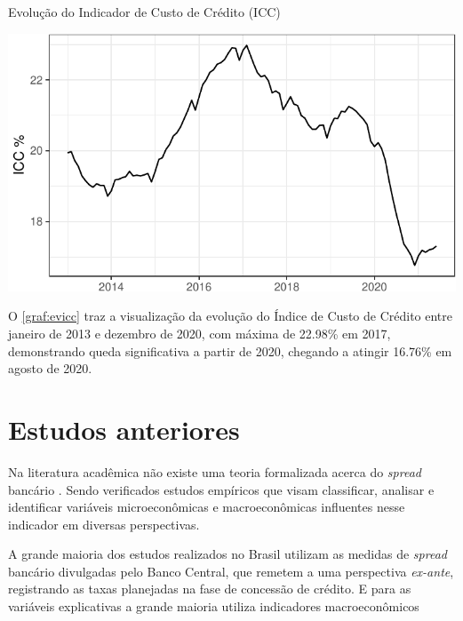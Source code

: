 \documentclass[
  12pt,
  12pt,
  openright,
  oneside,
  a4paper,
  chapter=TITLE,
  section=TITLE,
  subsection=TITLE,
  subsubsection=TITLE,
  english,
  portugues,
  sumario=tradicional]{abntex2}
\begin{document}
\begin{grafico}[!htbp]
\vspace{20pt}
\caption{Evolução do Indicador de Custo de Crédito (ICC)}
\vspace{-4mm}

\begin{center}\includegraphics{12-exportedfigures/ICC-1} \end{center}
\vspace{-3mm}
\label{graf:evicc}
\vspace{-2mm}
\end{grafico}

O \autoref{graf:evicc} traz a visualização da evolução do Índice de Custo de Crédito entre janeiro de 2013 e dezembro de 2020, com máxima de 22.98\% em 2017, demonstrando queda significativa a partir de 2020, chegando a atingir 16.76\% em agosto de 2020.

\section{Estudos anteriores}

Na literatura acadêmica não existe uma teoria formalizada acerca do \emph{spread} bancário \cite{timotio:2018}. Sendo verificados estudos empíricos que visam classificar, analisar e identificar variáveis microeconômicas e macroeconômicas influentes nesse indicador em diversas perspectivas.

A grande maioria dos estudos realizados no Brasil utilizam as medidas de
\emph{spread} bancário divulgadas pelo Banco Central, que remetem a uma perspectiva
\emph{ex-ante}, registrando as taxas planejadas na fase de concessão de crédito. E
para as variáveis explicativas a grande maioria utiliza indicadores
macroeconômicos \cite{dantas:2012}
\end{document}
